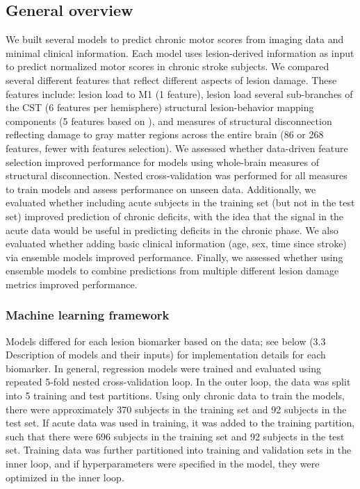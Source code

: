 \documentclass[10pt]{article}
\begin{document}
\subsection{General overview}

We built several models to predict chronic motor scores from imaging data and minimal clinical information. Each model uses lesion-derived information as input to predict normalized motor scores in chronic stroke subjects. We compared several different features that reflect different aspects of lesion damage. These features include: lesion load to M1 (1 feature), lesion load several sub-branches of the CST (6 features per hemisphere) structural lesion-behavior mapping components (5 features based on \cite{Bowren2022-rs}), and measures of structural disconnection reflecting damage to gray matter regions across the entire brain (86 or 268 features, fewer with features selection). We assessed whether data-driven feature selection improved performance for models using whole-brain measures of structural disconnection. Nested cross-validation was performed for all measures to train models and assess performance on unseen data.  Additionally, we evaluated whether including acute subjects in the training set (but not in the test set) improved prediction of chronic deficits, with the idea that the signal in the acute data would be useful in predicting deficits in the chronic phase. We also evaluated whether adding basic clinical information (age, sex, time since stroke) via ensemble models improved performance. Finally, we assessed whether using ensemble models to combine predictions from multiple different lesion damage metrics improved performance.

\subsubsection*{Machine learning framework}
Models differed for each lesion biomarker based on the data; see below (3.3 Description of models and their inputs) for implementation details for each biomarker. In general, regression models were trained and evaluated using repeated 5-fold nested cross-validation loop.  In the outer loop, the data was split into 5 training and test partitions. Using only chronic data to train the models, there were approximately 370 subjects in the training set and 92 subjects in the test set. If acute data was used in training, it was added to the training partition, such that there were 696 subjects in the training set and 92 subjects in the test set. Training data was further partitioned into training and validation sets in the inner loop, and if hyperparameters were specified in the model, they were optimized in the inner loop. 
\end{document}
